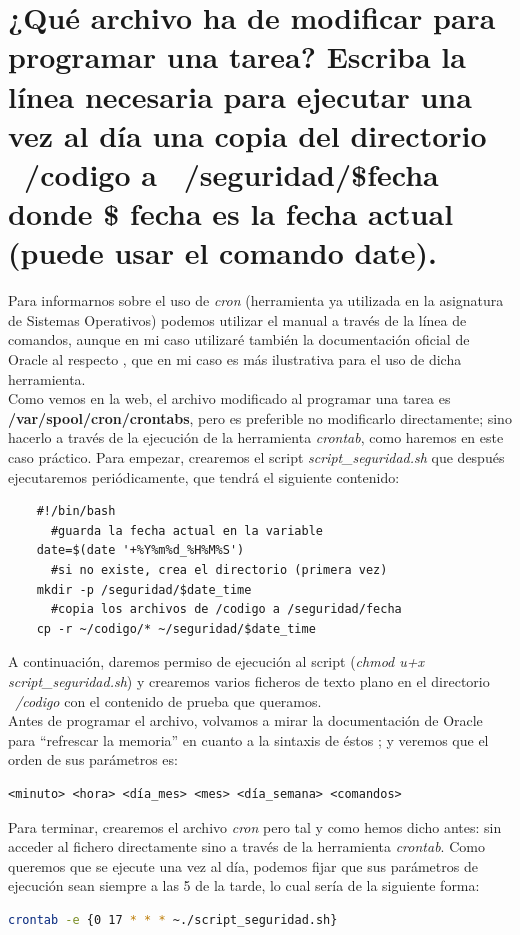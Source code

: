 \section{¿Qué archivo ha de modificar para programar una tarea? Escriba la línea necesaria para ejecutar una vez al día una copia del directorio ~/codigo a ~/seguridad/\$fecha donde \$ fecha es la fecha actual (puede usar el comando date).}
Para informarnos sobre el uso de \emph{cron} (herramienta ya utilizada en la asignatura de Sistemas Operativos) podemos utilizar el manual a través de la línea de comandos, aunque en mi caso utilizaré también la documentación oficial de Oracle al respecto \cite{cron}, que en mi caso es más ilustrativa para el uso de dicha herramienta. \\
Como vemos en la web, el archivo modificado al programar una tarea es \textbf{/var/spool/cron/crontabs}, pero es preferible no modificarlo directamente; sino hacerlo a través de la ejecución de la herramienta \emph{crontab}, como haremos en este caso práctico.
Para empezar, crearemos el script \emph{script\_seguridad.sh} que después ejecutaremos periódicamente, que tendrá el siguiente contenido:
\begin{verbatim}
	#!/bin/bash
	  #guarda la fecha actual en la variable
	date=$(date '+%Y%m%d_%H%M%S')
	  #si no existe, crea el directorio (primera vez)
	mkdir -p /seguridad/$date_time
	  #copia los archivos de /codigo a /seguridad/fecha
	cp -r ~/codigo/* ~/seguridad/$date_time
\end{verbatim}
A continuación, daremos permiso de ejecución al script (\emph{chmod u+x script\_seguridad.sh}) y crearemos varios ficheros de texto plano en el directorio \emph{~/codigo} con el contenido de prueba que queramos. \\
Antes de programar el archivo, volvamos a mirar la documentación de Oracle para ``refrescar la memoria'' en cuanto a la sintaxis de éstos \cite{cron-sintaxis}; y veremos que el orden de sus parámetros es:
\begin{verbatim}
<minuto> <hora> <día_mes> <mes> <día_semana> <comandos>
\end{verbatim}
Para terminar, crearemos el archivo \emph{cron} pero tal y como hemos dicho antes: sin acceder al fichero directamente sino a través de la herramienta \emph{crontab}. Como queremos que se ejecute una vez al día, podemos fijar que sus parámetros de ejecución sean siempre a las 5 de la tarde, lo cual sería de la siguiente forma:
\begin{lstlisting}[language=bash]
	crontab -e {0 17 * * * ~./script_seguridad.sh}
\end{lstlisting}


